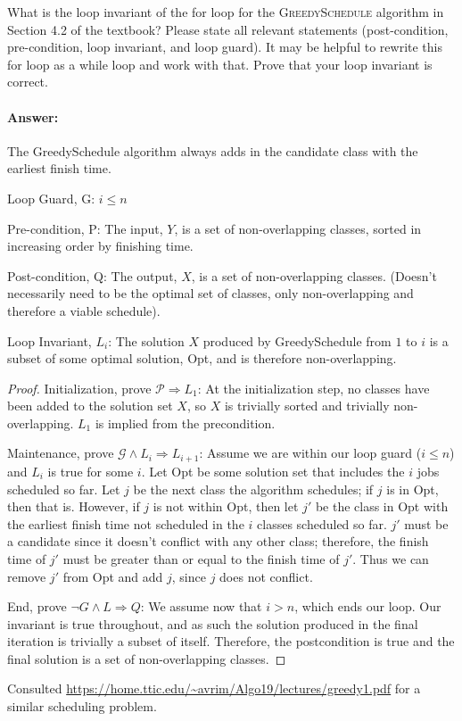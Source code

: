 \documentclass{article}
\begin{document}

What is the loop invariant of the for loop for the \textsc{GreedySchedule}
algorithm in Section 4.2 of the textbook?  Please state all relevant statements
(post-condition, pre-condition, loop invariant, and loop guard).  It may be
helpful to rewrite this for loop as a while loop and work with that.  Prove that
your loop invariant is correct.

\paragraph{Answer: }

The GreedySchedule algorithm always adds in the candidate class with the earliest finish time.

Loop Guard, G: $i \leq n$

Pre-condition, P: The input, $Y$, is a set of non-overlapping classes, sorted in increasing order by finishing time.

Post-condition, Q: The output, $X$, is a set of non-overlapping classes. (Doesn't necessarily need to be the optimal set of classes, only non-overlapping and therefore a viable schedule). 

Loop Invariant, $L_i$: The solution $X$ produced by GreedySchedule from $1$ to $i$  is a subset of some optimal solution, Opt, and is therefore non-overlapping.

\begin{proof}
Initialization, prove $\mathcal{P} \Rightarrow L_1$: At the initialization step, no classes have been added to the solution set $X$, so $X$ is trivially sorted and trivially non-overlapping. $L_1$ is implied from the precondition. 

Maintenance, prove $\mathcal{G} \wedge L_i \Rightarrow L_{i+1}$: Assume we are within our loop guard ($i \leq n$) and $L_i$ is true for some $i$. Let Opt be some solution set that includes the $i$ jobs scheduled so far. Let $j$ be the next class the algorithm schedules; if $j$ is in Opt, then that is. However, if $j$ is not within Opt, then let $j'$ be the class in Opt with the earliest finish time not scheduled in the $i$ classes scheduled so far. $j'$ must be a candidate since it doesn't conflict with any other class; therefore, the finish time of $j'$ must be greater than or equal to the finish time of $j'$. Thus we can remove $j'$ from Opt and add $j$, since $j$ does not conflict. 

End, prove $\neg G \wedge L \Rightarrow Q$: We assume now that $i > n$, which ends our loop. Our invariant is true throughout, and as such the solution produced in the final iteration is trivially a subset of itself. Therefore, the postcondition is true and the final solution is a set of non-overlapping classes. 
\end{proof}

Consulted \url{https://home.ttic.edu/~avrim/Algo19/lectures/greedy1.pdf} for a similar scheduling problem.
\end{document}
